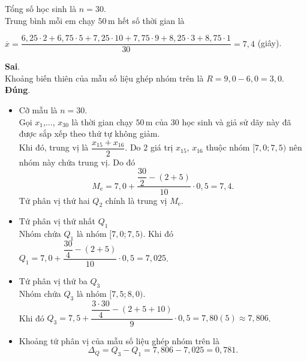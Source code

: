 \begin{ex}
{\begin{itemchoice}
			Tổng số học sinh là $n=30$.\\
			Trung bình mỗi em chạy $50$\,m hết số thời gian là
			\begin{center}
				$\overline{x}=\dfrac{6{,}25 \cdot 2+6{,}75 \cdot 5+7{,}25 \cdot 10+7{,}75 \cdot 9+8{,}25 \cdot 3+8{,}75 \cdot 1}{30}=7{,}4$ (giây).
			\end{center}
			\itemch \textbf{Sai}.\\
			Khoảng biến thiên của mẫu số liệu ghép nhóm trên là $R=9{,}0-6{,}0=3{,}0$.
			\itemch \textbf{Đúng}.
			\begin{itemize}
				\item Cỡ mẫu là $n=30$.\\
				Gọi $x_{1}$,$\ldots$, $x_{30}$ là thời gian chạy $50$\,m của $30$ học sinh và giả sử dãy này đã được sắp xếp theo thứ tự không giảm.\\
				Khi đó, trung vị là $\dfrac{x_{15}+x_{16}}{2}$. Do $2$ giá trị $x_{15}$, $x_{16}$ thuộc nhóm $[7{,}0;7{,}5)$ nên nhóm này chứa trung vị. Do đó
				\[
				M_{\text{e}}=7{,}0+\dfrac{\dfrac{30}{2}-(2+5)}{10} \cdot 0{,}5=7{,}4.
				\]
				Tứ phân vị thứ hai $Q_{2}$ chính là trung vị $M_{\text{e}}$.
				\item Tứ phân vị thứ nhất $Q_{1}$\\
				Nhóm chứa $Q_{1}$ là nhóm $[7{,}0;7{,}5)$. Khi đó $Q_{1}=7{,}0+\dfrac{\dfrac{30}{4}-(2+5)}{10} \cdot 0{,}5=7{,}025$.
				\item Tứ phân vị thứ ba $Q_{3}$\\
				Nhóm chứa $Q_{3}$ là nhóm $[7{,}5;8{,}0)$.\\
				Khi đó $Q_{3}=7{,}5+\dfrac{\dfrac{3\cdot30}{4}-(2+5+10)}{9} \cdot 0{,}5=7{,}80(5) \approx 7{,}806$.
				\item Khoảng tứ phân vị của mẫu số liệu ghép nhóm trên là  \[\Delta_{Q}=Q_{3}-Q_{1}=7{,}806-7{,}025=0{,}781.\]
			\end{itemize}
		\end{itemchoice}
	}
\end{ex}
